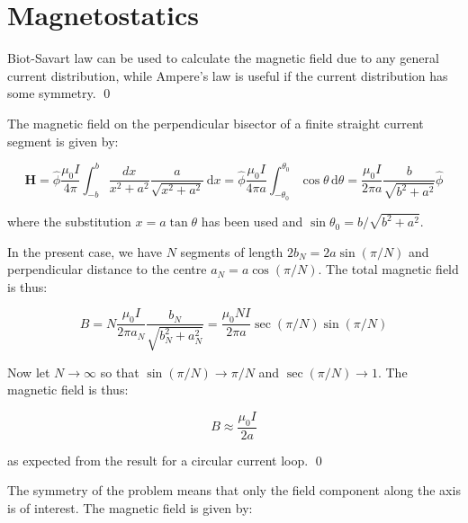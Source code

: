 \documentclass[12pt]{article}
\begin{document}
\pagebreak
\section*{Magnetostatics}


Biot-Savart law can be used to calculate the magnetic field due to any general current distribution, while Ampere's law is useful if the current distribution has some symmetry.
\qed



The magnetic field on the perpendicular bisector of a finite straight current segment is given by:

\begin{equation}
    \mathbf{H} = \hat{\phi} \frac{\mu_{0} I}{4\pi} \int_{-b}^{b} \frac{dx}{x^{2} + a^{2}} \frac{a}{\sqrt{x^{2} + a^{2}}} \, \mathrm{d}x = \hat{\phi} \frac{\mu_{0} I}{4\pi a} \int_{-\theta_{0}}^{\theta_{0}} \cos{\theta} \, \mathrm{d}\theta = \frac{\mu_{0} I}{2\pi a} \frac{b}{\sqrt{b^{2} + a^{2}}} \hat{\phi}
\end{equation}

where the substitution $x = a\tan{\theta}$ has been used and $\sin{\theta_{0}} = b/\sqrt{b^{2} + a^{2}}$.

In the present case, we have $N$ segments of length $2b_{N} = 2a\sin{(\pi/N)}$ and perpendicular distance to the centre $a_{N} = a\cos{(\pi/N)}$. The total magnetic field is thus:

\begin{equation}
    B = N \frac{\mu_{0} I}{2\pi a_{N}} \frac{b_{N}}{\sqrt{b_{N}^{2} + a_{N}^{2}}} = \frac{\mu_{0} N I}{2\pi a} \sec{(\pi/N)} \sin{(\pi/N)}
\end{equation}

Now let $N \to \infty$ so that $\sin{(\pi/N)} \to \pi/N$ and $\sec{(\pi/N)} \to 1$. The magnetic field is thus:

\begin{equation}
    B \approx \frac{\mu_{0} I}{2a}
\end{equation}

as expected from the result for a circular current loop.
\qed



The symmetry of the problem means that only the field component along the axis is of interest. The magnetic field is given by:
\end{document}
